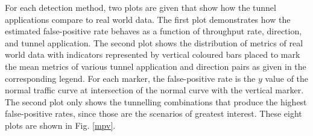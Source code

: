 \documentclass{llncs}
\begin{document}
For each detection method, two plots are given that show how the tunnel
applications compare to real world data. The first plot demonstrates how the estimated
false-positive rate behaves as a function of throughput rate, direction, and
tunnel application. The second plot shows the distribution of metrics of real
world data with indicators represented by vertical coloured bars placed to mark
the mean metrics of various tunnel application and direction pairs as given in
the corresponding legend. For each marker, the false-positive rate is the $y$
value of the normal traffic curve at intersection of the normal curve with the
vertical marker. The second plot only shows the tunnelling combinations that
produce the highest false-positive rates, since those are the scenarios of
greatest interest. These eight plots are shown in Fig. \ref{mpv}.

%
\end{document}
